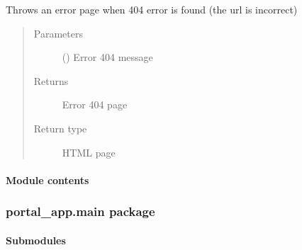 \documentclass[letterpaper,10pt,english]{sphinxmanual}
\begin{document}

\begin{fulllineitems}
\label{\detokenize{CE_app.errors:CE_app.errors.handlers.not_found_error}}
\sphinxAtStartPar
Throws an error page when 404 error is found (the url is incorrect)
\begin{quote}\begin{description}
\item[{Parameters}] \leavevmode
\sphinxAtStartPar
{} () \textendash{} Error 404 message

\item[{Returns}] \leavevmode
\sphinxAtStartPar
Error 404 page

\item[{Return type}] \leavevmode
\sphinxAtStartPar
HTML page

\end{description}\end{quote}

\end{fulllineitems}



\paragraph{Module contents}
\label{\detokenize{CE_app.errors:module-CE_app.errors}}\label{\detokenize{CE_app.errors:module-contents}}

\subsubsection{portal\_app.main package}
\label{\detokenize{CE_app.main:portal-app-main-package}}\label{\detokenize{CE_app.main::doc}}

\paragraph{Submodules}
\label{\detokenize{CE_app.main:submodules}}
\end{document}
